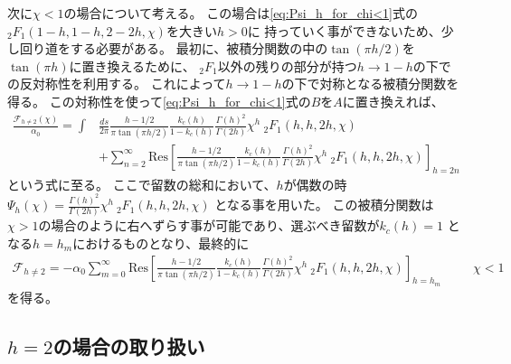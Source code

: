 次に$\chi < 1$の場合について考える。
この場合は\eqref{eq:Psi_h_for_chi<1}式の${}_2F_1(1-h,1-h,2-2h,\chi)$を大きい$h > 0$に
持っていく事ができないため、少し回り道をする必要がある。
最初に、被積分関数の中の$\tan(\pi h/2)$を$\tan(\pi h)$に置き換えるために、
${}_2F_1$以外の残りの部分が持つ$h\to 1-h$の下での反対称性を利用する。
これによって$h\to 1-h$の下で対称となる被積分関数を得る。
この対称性を使って\eqref{eq:Psi_h_for_chi<1}式の$B$を$A$に置き換えれば、
\begin{align}
	\frac{\mathcal{F}_{h\neq 2}(\chi)}{\alpha_0}
	= \int &\frac{ds}{2\pi}\frac{h-1/2}{\pi\tan(\pi h/2)}
		\frac{k_c(h)}{1-k_c(h)}\frac{\Gamma(h)^2}{\Gamma(2h)}
		\chi^h\ {}_2F_1(h, h, 2h, \chi)\nonumber\\
	&+ \sum_{n=2}^{\infty}\mathrm{Res}\left[
		\frac{h-1/2}{\pi\tan(\pi h/2)}\frac{k_c(h)}{1-k_c(h)}\frac{\Gamma(h)^2}{\Gamma(2h)}
		\chi^h\ {}_2F_1(h, h, 2h, \chi)
	\right]_{h=2n}
\end{align}
という式に至る。
ここで留数の総和において、$h$が偶数の時
$\Psi_h(\chi) = \frac{\Gamma(h)^2}{\Gamma(2h)}\chi^h\ {}_2F_1(h, h, 2h, \chi)$
となる事を用いた。
この被積分関数は$\chi > 1$の場合のように右へずらす事が可能であり、選ぶべき留数が$k_c(h)=1$
となる$h = h_m$におけるものとなり、最終的に
\begin{align}
	\mathcal{F}_{h\neq 2} = -\alpha_0\sum_{m=0}^{\infty}\mathrm{Res}\left[
		\frac{h-1/2}{\pi\tan(\pi h/2)}\frac{k_c(h)}{1-k_c(h)}\frac{\Gamma(h)^2}{\Gamma(2h)}
		\chi^h\ {}_2F_1(h, h, 2h, \chi)
	\right]_{h=h_m}
	\hspace{30pt}\chi < 1
\end{align}
を得る。

\subsection{$h = 2$の場合の取り扱い}

\pagebreak
